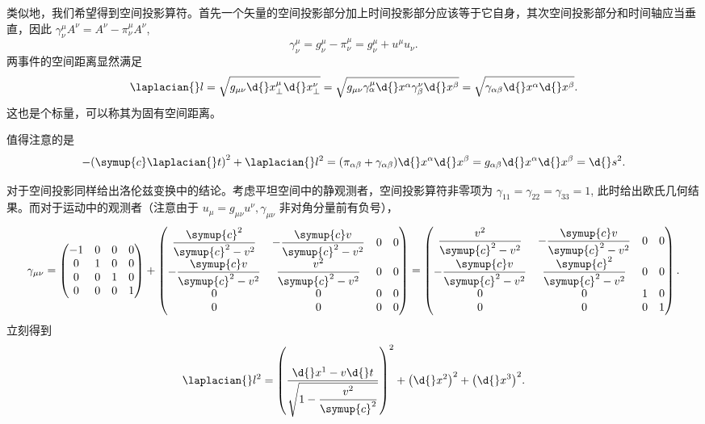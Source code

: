 \documentclass[UTF8, 12pt, a4paper, oneside, onecolumn, fontset=none]{ctexart}
\begin{document}
类似地，我们希望得到空间投影算符。首先一个矢量的空间投影部分加上时间投影部分应该等于它自身，其次空间投影部分和时间轴应当垂直，因此 $\gamma^{\mu}_{\nu}A^{\nu}=A^{\nu}-\pi_{\nu}^{\mu}A^{\nu}$,
\begin{equation}
\gamma^{\mu}_{\nu}=g^{\mu}_{\nu}-\pi^{\mu}_{\nu}=g_{\nu}^{\mu}+u^{\mu}u_{\nu}.
\end{equation}
两事件的空间距离显然满足
\begin{equation}
\laplacian{}l=\sqrt{g_{\mu\nu}\d{}x^{\mu}_{\bot}\d{}x^{\nu}_{\bot}}=\sqrt{g_{\mu\nu}\gamma^{\mu}_{\alpha}\d{}x^{\alpha}\gamma^{\nu}_{\beta}\d{}x^{\beta}}=\sqrt{\gamma_{\alpha\beta}\d{}x^{\alpha}\d{}x^{\beta}}.\label{2.1.12}
\end{equation}
这也是个标量，可以称其为固有空间距离。

值得注意的是
\begin{equation}
-\mleft(\symup{c}\laplacian{}t\mright)^{2}+\laplacian{}l^{2}=\mleft(\pi_{\alpha\beta}+\gamma_{\alpha\beta}\mright)\d{}x^{\alpha}\d{}x^{\beta}=g_{\alpha\beta}\d{}x^{\alpha}\d{}x^{\beta}=\d{}s^{2}.
\end{equation}

对于空间投影同样给出洛伦兹变换中的结论。考虑平坦空间中的静观测者，空间投影算符非零项为 $\gamma_{11}=\gamma_{22}=\gamma_{33}=1$, 此时给出欧氏几何结果。而对于运动中的观测者（注意由于 $u_{\mu}=g_{\mu\nu}u^{\nu},\gamma_{\mu\nu}$ 非对角分量前有负号），
\begin{equation}
\gamma_{\mu\nu}=\begin{pmatrix}
-1 & 0 & 0 & 0\\
0 & 1 & 0 & 0\\
0 & 0 & 1 & 0\\
0 & 0 & 0 & 1\\
\end{pmatrix}+
\begin{pmatrix}
\dfrac{\symup{c}^{2}}{\symup{c}^{2}-v^{2}} & -\dfrac{\symup{c}v}{\symup{c}^{2}-v^{2}} & 0 & 0\\
-\dfrac{\symup{c}v}{\symup{c}^{2}-v^{2}} & \dfrac{v^{2}}{\symup{c}^{2}-v^{2}} & 0 & 0\\
0 & 0 & 0 & 0\\
0 & 0 & 0 & 0\\
\end{pmatrix}=
\begin{pmatrix}
\dfrac{v^{2}}{\symup{c}^{2}-v^{2}} & -\dfrac{\symup{c}v}{\symup{c}^{2}-v^{2}} & 0 & 0\\
-\dfrac{\symup{c}v}{\symup{c}^{2}-v^{2}} & \dfrac{\symup{c}^{2}}{\symup{c}^{2}-v^{2}} & 0 & 0\\
0 & 0 & 1 & 0\\
0 & 0 & 0 & 1\\
\end{pmatrix}.
\end{equation}
立刻得到
\begin{equation}
\laplacian{}l^{2}=\mleft(\frac{\d{}x^{1}-v\d{}t}{\sqrt{1-\dfrac{v^{2}}{\symup{c}^{2}}}}\mright)^{2}+\mleft(\d{}x^{2}\mright)^{2}+\mleft(\d{}x^{3}\mright)^{2}.
\end{equation}
\end{document}
